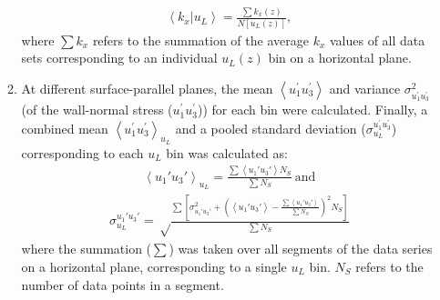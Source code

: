 \begin{enumerate}[(i)]
\begin{enumerate}[(1)]
    \begin{align}
        \left< k_x|u_L \right> = \frac{\sum k_x(z)}{N[u_L(z)]},
        \label{eq:kx_uL}
    \end{align} 
    where $\sum k_x$ refers to the summation of the average $k_x$ values of all data sets corresponding to an individual $u_L(z)$ bin on a horizontal plane. 
    \item At different surface-parallel planes, the mean $\left < u_{1}^\prime u_{3}^\prime\right >$ and variance $\sigma^2_{u_{1}^\prime u_{3}^\prime}$ (of the wall-normal stress ($u_{1}^\prime u_{3}^\prime$)) for each bin were calculated. Finally, a combined mean $\left < u_{1}^\prime u_{3}^\prime \right >_{u_L}$ and a pooled standard deviation ($\sigma^{u_{1}^\prime u_{3}^\prime}_{u_L}$) corresponding to each $u_L$ bin was calculated as: 
    \begin{align}
      \left < u_{1}'u_{3}' \right >_{u_L} = \frac{\sum \left < u_{1}'u_{3}'\right > N_S}{\sum N_S} \ \text{and}
      \label{eq:u'w'_mean}
    \end{align}
    \begin{align}
      \sigma^{u_{1}'u_{3}'}_{u_L} = \sqrt \frac{\sum [\sigma^2_{u_{1}'u_{3}'} + (\left < u_{1}'u_{3}'\right > -\frac{\sum \left < u_{1}'u_{3}'\right >}{\sum N_S})^2 N_S]}{\sum N_S}
     \label{eq:std_uw} 
    \end{align}    
    where the summation ($\sum $) was taken over all segments of the data series on a horizontal plane, corresponding to a single $u_L$ bin. $N_S$ refers to the number of data points in a segment. 
 \end{enumerate}
\end{enumerate}


